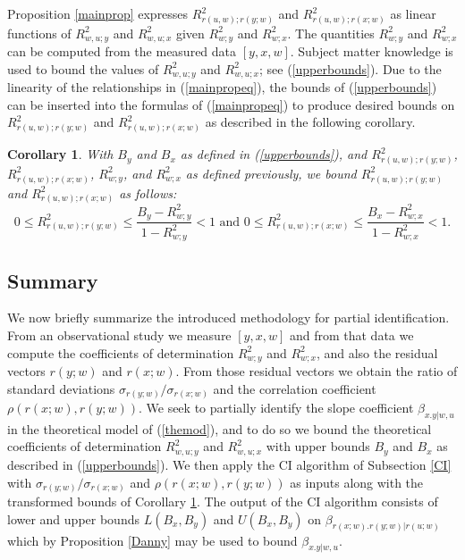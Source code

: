 \documentclass[11pt]{amsart}
\newtheorem{corollary}[theorem]{Corollary}
\begin{document}
Proposition \ref{mainprop} expresses $R^2_{r(u,w);r(y;w)}$ and $R^2_{r(u,w);r(x;w)}$ as linear functions of $R^2_{w,u;y}$ and $R^2_{w,u;x}$ given $R^2_{w;y}$ and $R^2_{w;x}$. The quantities $R^2_{w;y}$ and $R^2_{w;x}$ can be computed from the measured data $[y,x,w]$. Subject matter knowledge is used to bound the values of $R^2_{w,u;y}$ and $R^2_{w,u;x}$; see (\ref{upperbounds}). Due to the linearity of the relationships in (\ref{mainpropeq}), the bounds of (\ref{upperbounds}) can be inserted into the formulas of (\ref{mainpropeq}) to produce desired bounds on $R^2_{r(u,w);r(y;w)}$ and $R^2_{r(u,w);r(x;w)}$ as described in the following corollary.  
\begin{corollary}
\label{cor}
With $B_y$ and $B_x$ as defined in (\ref{upperbounds}), and $R^2_{r(u,w);r(y;w)}$, $R^2_{r(u,w);r(x;w)}$, $R^2_{w;y}$, and $R^2_{w;x}$ as defined previously, we bound $R^2_{r(u,w);r(y;w)}$ and $R^2_{r(u,w);r(x;w)}$ as follows:
\begin{equation}
\label{algobounds}
0\leq R^2_{r(u,w);r(y;w)} \leq \frac{B_y-R^2_{w;y}}{1-R^2_{w;y}}<1\textrm{~and~}0\leq R^2_{r(u,w);r(x;w)} \leq \frac{B_x-R^2_{w;x}}{1-R^2_{w;x}}<1.
\end{equation}
\end{corollary}

\subsection{Summary}
\label{summary}
We now briefly summarize the introduced methodology for partial identification. From an observational study we measure $[y,x,w]$ and from that data we compute the coefficients of determination $R^2_{w;y}$ and $R^2_{w;x}$, and also the residual vectors $r(y;w)$ and $r(x;w)$. From those residual vectors we obtain the ratio of standard deviations $\sigma_{r(y;w)}/\sigma_{r(x;w)}$ and the correlation coefficient $\rho(r(x;w),r(y;w))$. We seek to partially identify the slope coefficient $\beta_{x.y|w,u}$ in the theoretical model of (\ref{themod}), and to do so we bound the theoretical coefficients of determination $R^2_{w,u;y}$ and $R^2_{w,u;x}$ with upper bounds $B_y$ and $B_x$ as described in (\ref{upperbounds}). We then apply the CI algorithm of Subsection \ref{CI} with $\sigma_{r(y;w)}/\sigma_{r(x;w)}$ and $\rho(r(x;w),r(y;w))$ as inputs along with the transformed bounds of Corollary \ref{cor}. The output of the CI algorithm consists of lower and upper bounds $L(B_x,B_y)$ and $U(B_x,B_y)$ on $\beta_{r(x;w).r(y;w)|r(u;w)}$ which by Proposition \ref{Danny} may be used to bound $\beta_{x.y|w,u}$. 
\end{document}
